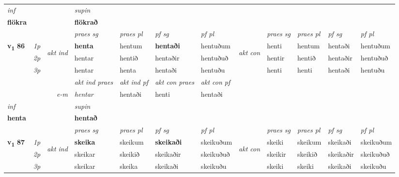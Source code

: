 \begin{longtable}[l]{X>{\footnotesize\itshape}llXXXXlXXXX}
\cmidrule{4-7}
   {\textit{inf}} & &      & \textit{supin}   \\*
  {\textbf{flökra}} & &      &  \textbf{flökrað}   \\*

\midrule

 & &   & \textit{praes sg}  & \textit{praes pl}    & \textit{ pf sg} & \textit{pf pl} & & \textit{praes sg}  & \textit{praes pl}    & \textit{pf sg} & \textit{pf pl }  \\ \cmidrule{4-7} \cmidrule{9-12}
 \multirow{2}{*}{{{\textbf{v{\textsubscript{1}}} \Large{\textbf{86}}}}}  & 1p & \multirow{3}{*}{\begin{turn}{90}\textit{akt ind}\end{turn}} & \textbf{henta} & hentum & \textbf{hentaði} & hentuðum & \multirow{3}{*}{\begin{turn}{90}\textit{akt con}\end{turn}} &henti & hentum & hentaði & hentuðum\\*
 & 2p &  &  hentar  & hentið & hentaðir & hentuðuð & & hentir & hentið & hentaðir & hentuðuð \\*
 & 3p &  & hentar & henta & hentaði & hentuðu & & henti & henti& hentaði & hentuðu \\*
\cmidrule{4-7} \cmidrule{9-12}

   && &  \textit{akt ind praes} & \textit{akt ind pf} & \textit{akt con praes} & \textit{akt con pf} \\*
\multicolumn{3}{r}{\textit{e-m}} & hentar & hentaði & henti & hentaði \\*

\cmidrule{4-7}
   {\textit{inf}} & &      & \textit{supin}   \\*
  {\textbf{henta}} & &      &  \textbf{hentað}   \\*

\midrule

 & &   & \textit{praes sg}  & \textit{praes pl}    & \textit{ pf sg} & \textit{pf pl} & & \textit{praes sg}  & \textit{praes pl}    & \textit{pf sg} & \textit{pf pl }  \\ \cmidrule{4-7} \cmidrule{9-12}
 \multirow{2}{*}{{{\textbf{v{\textsubscript{1}}} \Large{\textbf{87}}}}}  & 1p & \multirow{3}{*}{\begin{turn}{90}\textit{akt ind}\end{turn}} & \textbf{skeika} & skeikum & \textbf{skeikaði} & skeikuðum & \multirow{3}{*}{\begin{turn}{90}\textit{akt con}\end{turn}} &skeiki & skeikum & skeikaði & skeikuðum\\*
 & 2p &  &  skeikar  & skeikið & skeikaðir & skeikuðuð & & skeikir & skeikið & skeikaðir & skeikuðuð \\*
 & 3p &  & skeikar & skeika & skeikaði & skeikuðu & & skeiki & skeiki& skeikaði & skeikuðu \\*
\cmidrule{4-7} \cmidrule{9-12}


\end{longtable}

